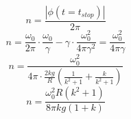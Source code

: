 \documentclass[a5paper,10pt]{article}
\begin{document}
\begin{equation}
	n=\frac{|\phi(t=t_{stop})|}{2\pi}
\end{equation}
\begin{equation}
	n=\frac{\omega_0}{2\pi}\cdot\frac{\omega_0}{\gamma}
		-
		\gamma\cdot \frac{\omega^2_0}{4\pi\gamma^2}=
		\frac{\omega_0^2}{4\pi\gamma}
\end{equation}
\begin{equation}
	n=\frac{\omega_0^2}{4\pi\cdot
	\frac{2kg}{R}
					\left(
						\frac{1}{k^2+1}+
						\frac{k}{k^2+1}
					\right)
	}
\end{equation}
\begin{equation}
	n=\frac {\omega_0^2 R (k^2+1)}
			{8\pi kg(1+k)}
\end{equation}
\end{document}
